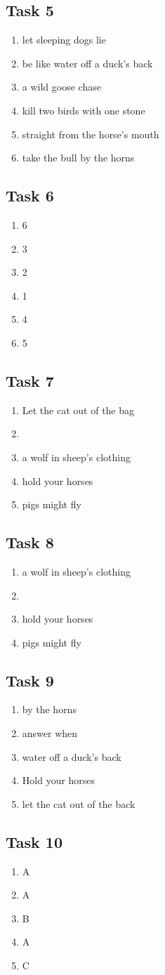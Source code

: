 \documentclass[a4paper]{article}
\begin{document}
\subsection{Task 5}
\begin{enumerate}
	\item let sleeping dogs lie
	\item be like water off a duck's back
	\item a wild goose chase
	\item kill two birds with one stone
	\item straight from the horse's mouth
	\item take the bull by the horns
\end{enumerate}
\subsection{Task 6}
\begin{enumerate}
	\item 6
	\item 3
	\item 2
	\item 1
	\item 4
	\item 5
\end{enumerate}
\subsection{Task 7}
\begin{enumerate}
	\item Let the cat out of the bag
	\item 
	\item a wolf in sheep's clothing
	\item hold your horses
	\item pigs might fly
\end{enumerate}
\subsection{Task 8}
\begin{enumerate}
	\item a wolf in sheep's clothing
	\item 
	\item hold your horses
	\item pigs might fly
\end{enumerate}
\subsection{Task 9}
\begin{enumerate}
	\item by the horns
	\item answer when
	\item water off a duck's back
	\item Hold your horses
	\item let the cat out of the back
\end{enumerate}
\subsection{Task 10}
\begin{enumerate}
	\item A
	\item A
	\item B
	\item A
	\item C
\end{enumerate}
\end{document}
